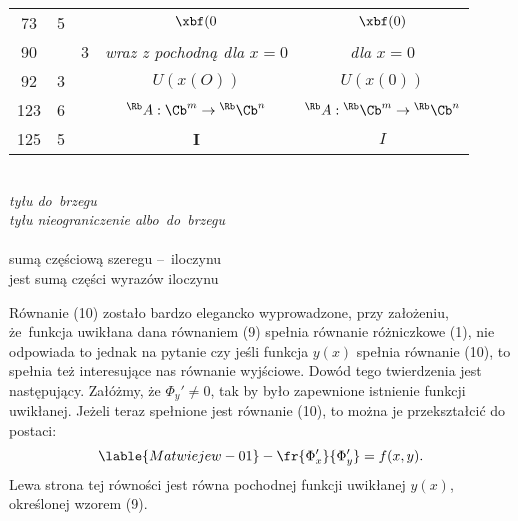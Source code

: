 \documentclass[a4paper,11pt]{article}
\begin{document}
\begin{center}
\begin{tabular}{|c|c|c|c|c|}
    73  &  5 & & $\xbf( 0$ & $\xbf( 0 )$ \\
    90  & &  3 & \emph{wraz z pochodną dla} $x = 0$ & \emph{dla} $x = 0$ \\
    92  &  3 & & $U( x( O ) )$ & $U( x( 0 ) )$ \\
    123 &  6 & & $^{ \Rb }A : \Cb^{ m } \to { }^{ \Rb }\Cb^{ n }$
           & ${ }^{ \Rb }A : { }^{ \Rb }\Cb^{ m } \to { }^{ \Rb }\Cb^{ n }$ \\
    125 &  5 & & $\mathbf{I}$ & $I$ \\
    \hline
  \end{tabular}
\end{center}
\noi
{} \\
\Jest \emph{tyłu do~brzegu} \\
\Powin  \emph{tyłu nieograniczenie albo~do~brzegu} \\
 \\
\Jest sumą częściową szeregu --~iloczynu \\
\Powin  jest sumą części wyrazów iloczynu \\








\start {} Równanie (10) zostało bardzo elegancko wyprowadzone,
przy założeniu, że~funkcja uwikłana dana równaniem (9) spełnia
równanie różniczkowe (1), nie odpowiada to jednak na pytanie czy jeśli
funkcja $y( x )$ spełnia równanie (10), to spełnia też interesujące
nas równanie wyjściowe. Dowód tego twierdzenia jest następujący.
Załóżmy, że $\Phi_{ y }' \neq 0$, tak by było zapewnione istnienie
funkcji uwikłanej. Jeżeli teraz spełnione jest równanie (10), to można
je przekształcić do postaci:
\begin{equation}
  \lable{Matwiejew-01}
  -\fr{ \Phi_{ x }' }{ \Phi_{ y }' } = f( x, y ).
\end{equation}
Lewa strona tej równości jest równa pochodnej funkcji uwikłanej
$y( x )$, określonej wzorem (9). \\
\start {} \Dok \\
\start {} \Dok
\end{document}
